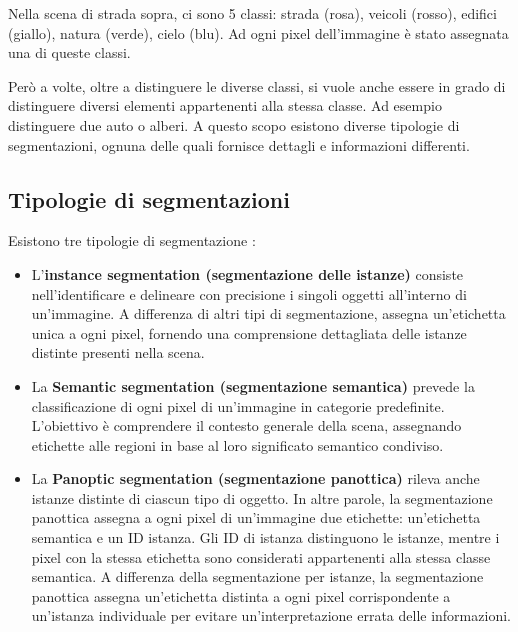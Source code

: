 Nella scena di strada sopra, ci sono 5 classi: strada (rosa), veicoli (rosso), edifici (giallo), 
natura (verde), cielo (blu). Ad ogni pixel dell'immagine è stato assegnata una 
di queste classi.

Però a volte, oltre a distinguere le diverse classi, si vuole anche essere in grado di 
distinguere diversi elementi appartenenti 
alla stessa classe. Ad esempio distinguere due auto o alberi. A questo scopo esistono diverse tipologie di segmentazioni, 
ognuna delle quali fornisce dettagli e informazioni differenti.

\subsection{Tipologie di segmentazioni}
Esistono tre tipologie di segmentazione  \cite{ImageSegmentation_Labeller}:
\begin{itemize}
    \item L'\textbf{instance segmentation (segmentazione delle istanze)} consiste nell'identificare e delineare con 
    precisione i singoli oggetti all'interno di un'immagine. A differenza di altri tipi di segmentazione, 
    assegna un'etichetta unica a ogni pixel, fornendo una comprensione dettagliata delle istanze distinte 
    presenti nella scena.

    \item La \textbf{Semantic segmentation (segmentazione semantica)} prevede la classificazione di 
    ogni pixel di un'immagine in categorie predefinite. L'obiettivo è comprendere il contesto generale 
    della scena, assegnando etichette alle regioni in base al loro significato semantico condiviso.

    \item La \textbf{Panoptic segmentation (segmentazione panottica)} rileva anche istanze distinte di 
    ciascun tipo di oggetto. In altre parole, la segmentazione panottica assegna a ogni pixel di un'immagine 
    due etichette: un'etichetta semantica e un ID istanza.
    Gli ID di istanza distinguono le istanze, mentre i pixel con la stessa etichetta sono considerati 
    appartenenti alla stessa classe semantica. A differenza della segmentazione per istanze, la 
    segmentazione panottica assegna un'etichetta distinta a ogni pixel corrispondente a un'istanza 
    individuale per evitare un'interpretazione errata delle informazioni.
\end{itemize}

